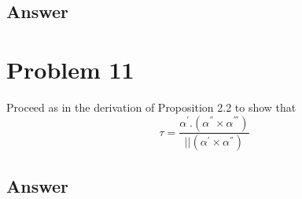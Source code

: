 \documentclass[
	12pt, %
]{fphw}
\theoremstyle{plain}
\begin{document}
\subsection*{Answer}

\section*{Problem 11}
\begin{problem}
     Proceed as in the derivation of Proposition 2.2 to show that\\
     \begin{equation}
          \tau = \frac{\alpha^'.(\alpha^{''} \times \alpha^{'''})}{||(\alpha^' \times \alpha^{''})}
     \end{equation}
\end{problem}
\subsection*{Answer}
\end{document}
